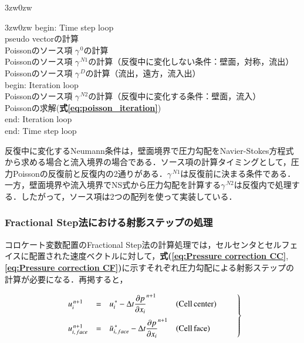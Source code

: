 \begin{indentation}{3zw}{0zw}
\begin{indentation}{3zw}{0zw}
{ \small
\noindent begin: Time step loop\\
\hspace{1cm}pseudo vectorの計算\\
\hspace{1cm}Poissonのソース項 $\gamma^{\,0}$の計算\\
\hspace{1cm}Poissonのソース項 $\gamma^{\,N1}$の計算（反復中に変化しない条件：壁面，対称，流出）\\
\hspace{1cm}Poissonのソース項 $\gamma^{\,D}$の計算（流出，遠方，流入出）\\
\hspace{1cm}begin: Iteration loop\\
\hspace{2cm}Poissonのソース項 $\gamma^{\,N2}$の計算（反復中に変化する条件：壁面，流入）\\
\hspace{2cm}Poissonの求解(\textbf{式\ref{eq:poisson_iteration}})\\
\hspace{1cm}end: Iteration loop\\
end: Time step loop\\
}
\end{indentation}

反復中に変化するNeumann条件は，壁面境界で圧力勾配をNavier-Stokes方程式から求める場合と流入境界の場合である．ソース項の計算タイミングとして，圧力Poissonの反復前と反復内の2通りがある．$\gamma^{\,N1}$は反復前に決まる条件である．一方，壁面境界や流入境界でNS式から圧力勾配を計算する$\gamma^{\,N2}$は反復内で処理する．したがって，ソース項は2つの配列を使って実装している．

\end{indentation}

%
\subsubsection{Fractional Step法における射影ステップの処理}
コロケート変数配置のFractional Step法の計算処理では，セルセンタとセルフェイスに配置された速度ベクトルに対して，\textbf{式(\ref{eq:Pressure correction CC}}, \textbf{\ref{eq:Pressure correction CF})}に示すそれぞれ圧力勾配による射影ステップの計算が必要になる．再掲すると，

\begin{equation}
\left.
\begin{array}{llll}
u_i^{\,n+1} &=& \displaystyle{ u_i^{\,*} - \Delta t {\frac{\partial p}{\partial x_i}}^{n+1} } & \mathrm{(Cell\,center)} \vspace{2mm}\\
u_{i,\,face}^{\,n+1} &=& \displaystyle{ \bar{u}_{i,\,face}^{\,*} - \Delta t {\frac{\partial p}{\partial x_i}}^{n+1} } & \mathrm{(Cell\,face)}\\
\end{array} \qquad \right \}
\label{eq:prj step}
\end{equation}

